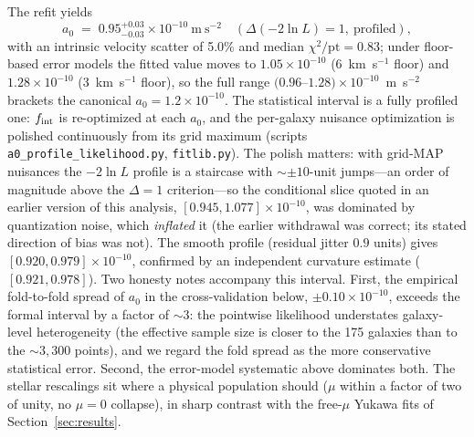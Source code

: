 \documentclass[11pt,a4paper]{article}
\begin{document}
The refit yields
\begin{equation}
a_0 \;=\; 0.95^{+0.03}_{-0.03} \times 10^{-10}~\mathrm{m~s^{-2}}
\quad (\Delta(-2\ln L) = 1,\ \text{profiled}),
\end{equation}
with an intrinsic velocity scatter of 5.0\% and median
$\chi^2/\mathrm{pt} = 0.83$; under floor-based error models the
fitted value moves to $1.05\times10^{-10}$ (6~km~s$^{-1}$ floor) and
$1.28\times10^{-10}$ (3~km~s$^{-1}$ floor), so the full range
$(0.96$--$1.28)\times10^{-10}$~m~s$^{-2}$ brackets the canonical
$a_0 = 1.2\times10^{-10}$.
The statistical interval is a fully profiled one: $f_{\rm int}$ is
re-optimized at each $a_0$, and the per-galaxy nuisance optimization
is polished continuously from its grid maximum (scripts
\texttt{a0\_profile\_likelihood.py}, \texttt{fitlib.py}).  The
polish matters: with grid-MAP nuisances the $-2\ln L$ profile is a
staircase with $\sim\pm10$-unit jumps---an order of magnitude above
the $\Delta = 1$ criterion---so the conditional slice quoted in an
earlier version of this analysis, $[0.945, 1.077]\times10^{-10}$,
was dominated by quantization noise, which \emph{inflated} it (the
earlier withdrawal was correct; its stated direction of bias was
not).  The smooth profile (residual jitter $0.9$ units) gives
$[0.920, 0.979]\times10^{-10}$, confirmed by an independent
curvature estimate ($[0.921, 0.978]$).
Two honesty notes accompany this interval.  First, the empirical
fold-to-fold spread of $a_0$ in the cross-validation below,
$\pm0.10\times10^{-10}$, exceeds the formal interval by a factor of
$\sim3$: the pointwise likelihood understates galaxy-level
heterogeneity (the effective sample size is closer to the 175
galaxies than to the $\sim3{,}300$ points), and we regard the fold
spread as the more conservative statistical error.  Second, the
error-model systematic above dominates both.
The stellar rescalings sit where a physical population should
($\mu$ within a factor of two of unity, no $\mu = 0$ collapse), in
sharp contrast with the free-$\mu$ Yukawa fits of
Section~\ref{sec:results}.
\end{document}
